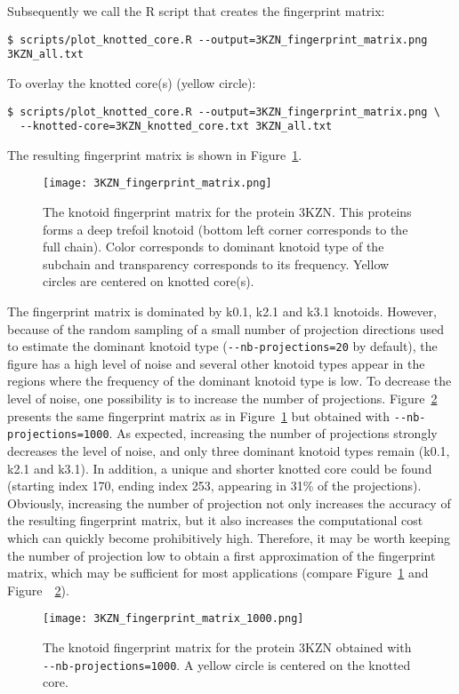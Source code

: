 Subsequently we call the {\ttfamily R} script that creates the fingerprint matrix:
\begin{lstlisting}
$ scripts/plot_knotted_core.R --output=3KZN_fingerprint_matrix.png 3KZN_all.txt
\end{lstlisting}
To overlay the knotted core(s) (yellow circle):
\begin{lstlisting}
$ scripts/plot_knotted_core.R --output=3KZN_fingerprint_matrix.png \
  --knotted-core=3KZN_knotted_core.txt 3KZN_all.txt 
\end{lstlisting}
The resulting fingerprint matrix is shown in Figure~\ref{fig:3KZN:fingerprint}.
\begin{figure}[t]
\centering
\texttt{[image: 3KZN\_fingerprint\_matrix.png]}
\caption{The knotoid fingerprint matrix for the protein 3KZN. This proteins forms a deep trefoil knotoid (bottom left corner corresponds to the full chain). Color corresponds to dominant knotoid type of the subchain and transparency corresponds to its frequency. Yellow circles are centered on knotted core(s).}\label{fig:3KZN:fingerprint}
\end{figure}
The fingerprint matrix is dominated by k0.1, k2.1 and k3.1 knotoids. However, because of the random sampling of a small number of projection directions used to estimate the dominant knotoid type (\lstinline{--nb-projections=20} by default), the figure has a high level of noise and several other knotoid types appear in the regions where the frequency of the dominant knotoid type is low. To decrease the level of noise, one possibility is to increase the number of projections. Figure~\ref{fig:3KZN:fingerprint1000} presents the same fingerprint matrix as in Figure~\ref{fig:3KZN:fingerprint} but obtained with \lstinline{--nb-projections=1000}. As expected, increasing the number of projections strongly decreases the level of noise, and only three dominant knotoid types remain (k0.1, k2.1 and k3.1). In addition, a unique and shorter knotted core could be found (starting index 170, ending index 253, appearing in 31\% of the projections).
Obviously, increasing the number of projection not only increases the accuracy of the resulting fingerprint matrix, but it also increases the computational cost which can quickly become prohibitively high. Therefore, it may be worth keeping the number of projection low to obtain a first approximation of the fingerprint matrix, which may be sufficient for most applications (compare Figure~\ref{fig:3KZN:fingerprint} and Figure~~\ref{fig:3KZN:fingerprint1000}). 
\begin{figure}[t]
\centering
\texttt{[image: 3KZN\_fingerprint\_matrix\_1000.png]}
\caption{The knotoid fingerprint matrix for the protein 3KZN obtained with \lstinline{--nb-projections=1000}. A yellow circle is centered on the knotted core.}\label{fig:3KZN:fingerprint1000}
\end{figure}


